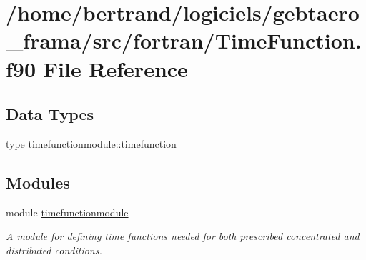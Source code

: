 \hypertarget{_time_function_8f90}{}\section{/home/bertrand/logiciels/gebtaero\+\_\+frama/src/fortran/\+Time\+Function.f90 File Reference}
\label{_time_function_8f90}
\subsection*{Data Types}
\begin{DoxyCompactItemize}
\item 
type \hyperlink{structtimefunctionmodule_1_1timefunction}{timefunctionmodule\+::timefunction}
\end{DoxyCompactItemize}
\subsection*{Modules}
\begin{DoxyCompactItemize}
\item 
module \hyperlink{namespacetimefunctionmodule}{timefunctionmodule}
\begin{DoxyCompactList}\small\item\em A module for defining time functions needed for both prescribed concentrated and distributed conditions. \end{DoxyCompactList}\end{DoxyCompactItemize}
